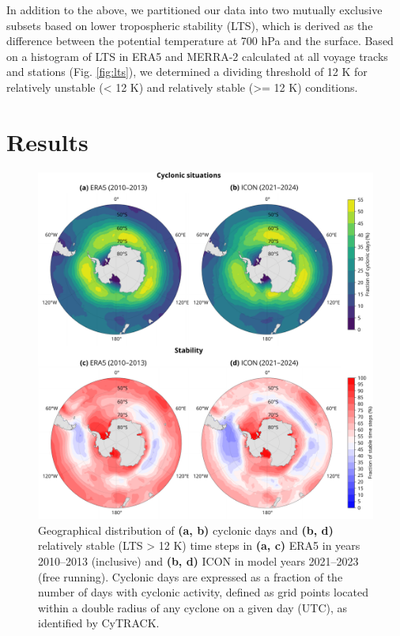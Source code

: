 \documentclass[12pt,a4paper]{article}
\begin{document}
In addition to the above, we partitioned our data into two mutually exclusive
subsets based on lower tropospheric stability (LTS), which is derived as the difference between the potential temperature at 700 hPa
and the surface.  Based on a histogram of LTS in ERA5 and MERRA-2 calculated at
all voyage tracks and stations (Fig.  \ref{fig:lts}), we determined a dividing
threshold of 12 K for relatively unstable (< 12 K) and relatively stable (>= 12
K) conditions.

\section{Results}
\label{sec:results}

\begin{figure}[p!]
\centering
\includegraphics[width=\textwidth]{img/cyc_stab_dist.pdf}
\caption{
Geographical distribution of \textbf{(a, b)} cyclonic days and \textbf{(b, d)}
relatively stable (LTS > 12 K) time steps in \textbf{(a, c)} ERA5 in years
2010--2013 (inclusive) and \textbf{(b, d)} ICON in model years 2021--2023 (free
running). Cyclonic days are expressed as a fraction of the number of days with
cyclonic activity, defined as grid points located within a double radius of any
cyclone on a given day (UTC), as identified by CyTRACK.
}
\label{fig:cyclone-stability}
\end{figure}
\end{document}
